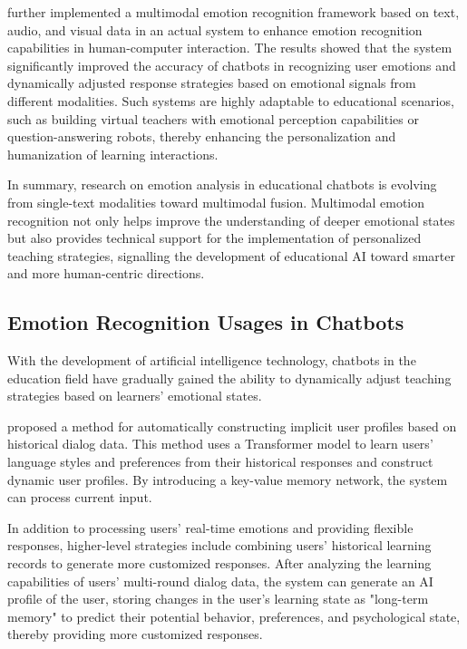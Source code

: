 \documentclass{xum_review}
\begin{document}
\citet{kovacs2024multimodal} further implemented a multimodal
emotion recognition framework based on text, audio, and visual data in an actual
system to enhance emotion recognition capabilities in human-computer
interaction. The results showed that the system significantly improved the
accuracy of chatbots in recognizing user emotions and dynamically adjusted
response strategies based on emotional signals from different modalities. Such
systems are highly adaptable to educational scenarios, such as building virtual
teachers with emotional perception capabilities or question-answering robots,
thereby enhancing the personalization and humanization of learning interactions. 

In summary, research on emotion analysis in educational chatbots is evolving
from single-text modalities toward multimodal fusion. Multimodal emotion
recognition not only helps improve the understanding of deeper emotional states
but also provides technical support for the implementation of personalized
teaching strategies, signalling the development of educational AI toward smarter
and more human-centric directions.  

\subsection{Emotion Recognition Usages in Chatbots}

With the development of artificial intelligence technology, chatbots in the
education field have gradually gained the ability to dynamically adjust teaching
strategies based on learners' emotional states.

\citet{ma2021one} proposed a method for automatically constructing
implicit user profiles based on historical dialog data. This method uses a
Transformer model to learn users' language styles and preferences from their
historical responses and construct dynamic user profiles. By introducing a
key-value memory network, the system can process current input. 

In addition to processing users' real-time emotions and providing flexible
responses, higher-level strategies include combining users' historical learning
records to generate more customized responses. After analyzing the learning
capabilities of users' multi-round dialog data, the system can generate an AI
profile of the user, storing changes in the user's learning state as "long-term
memory" to predict their potential behavior, preferences, and psychological
state, thereby providing more customized responses.
\end{document}
